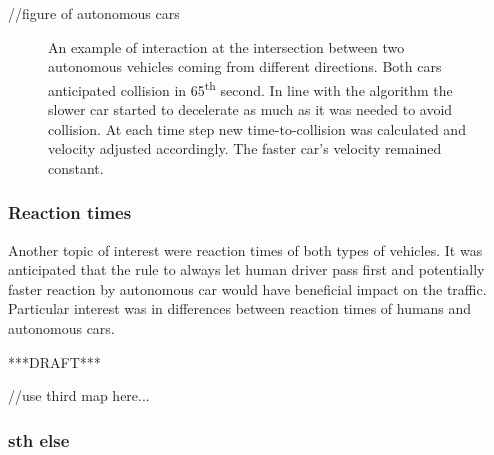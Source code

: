 \documentclass[11pt,english]{article}
\begin{document}
//figure of autonomous cars

\begin{figure}[!] %
\caption{An example of interaction at the intersection between two autonomous vehicles coming from different directions. Both cars anticipated collision in 65\textsuperscript{th} second. In line with the algorithm the slower car started to decelerate as much as it was needed to avoid collision. At each time step new time-to-collision was calculated and velocity adjusted accordingly. The faster car's velocity remained constant.}
\label{fig:interactions_example_2}
\end{figure}





\subsubsection*{Reaction times}


Another topic of interest were reaction times of both types of vehicles. It was anticipated that the rule to always let human driver pass first and potentially faster reaction by autonomous car would have beneficial impact on the traffic. Particular interest was in differences between reaction times of humans and autonomous cars.

***DRAFT***

//use third map here...





\subsubsection*{sth else}
\end{document}
